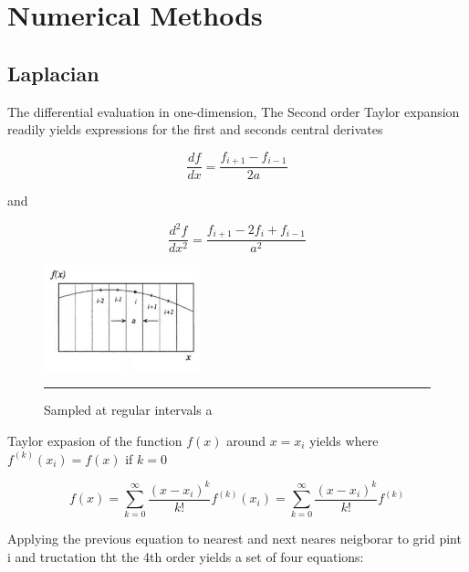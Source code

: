 \section{Numerical Methods}



\subsection{Laplacian}


\cite{landaverde}

The differential evaluation in one-dimension,
The Second order Taylor expansion readily yields expressions for the first and seconds central derivates

$$ \dfrac{df}{dx} = \dfrac{f_{i+1} - f_{i-1} }{2a}$$

and

$$ \dfrac{d^{2}f}{dx^{2}} = \dfrac{f_{i+1} - 2f_{i}+f_{i-1} }{a^2}$$

\begin{figure}[htbp]
	\centering
		\includegraphics[width=0.4\textwidth]{Figures/taylor.png}
		\rule{35em}{0.2pt}
	\caption[Sampled at regular intervals a, Taylor expansion]{Sampled at regular intervals a}
	\label{fig:taylor}
\end{figure}

Taylor expasion of the function $f(x)$ around $x=x_i$ yields where $f^{(k)}(x_i) = f(x)$ if $k=0$

$$f(x) = \sum\limits_{k=0}^{\infty} \dfrac{(x-x_i)^k}{k!}f^{(k)}(x_i) = \sum\limits_{k=0}^{\infty} \dfrac{(x-x_i)^k}{k!}f^{(k)}$$

Applying the previous equation to nearest and next neares neigborar to grid pint i and tructation tht the 4th order yields a set of four equations:

